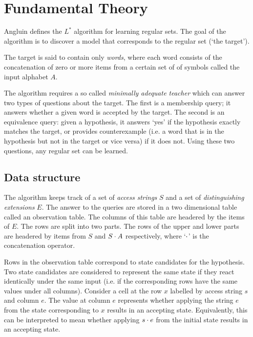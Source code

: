 \documentclass[multi,crop=false,class=article]{standalone}
\begin{document}
\section{Fundamental Theory}
\label{sec:fundamental-theory}

Angluin defines the $L^*$ algorithm for learning regular sets\cite{Angluin87}.
The goal of the algorithm is to discover a model that corresponds to the regular
set (`the target').

The target is said to contain only \textit{words}, where each word consists
of the concatenation of zero or more items from a certain set of of symbols
called the input alphabet $A$.

The algorithm requires a so called \textit{minimally adequate teacher} which can
answer two types of questions about the target. The first is a membership query;
it answers whether a given word is accepted by the target. The second is an
equivalence query: given a hypothesis, it answers `yes' if the hypothesis
exactly matches the target, or provides counterexample (i.e. a word that is in
the hypothesis but not in the target or vice versa) if it does not. Using these
two questions, any regular set can be learned.

\subsection{Data structure}
\label{sec:data-structure}
The algorithm keeps track of a set of \textit{access strings} $S$ and a set of
\textit{distinguishing extensions} $E$. The answer to the queries are stored in
a two dimensional table called an observation table. The columns of this table
are headered by the items of $E$. The rows are split into two parts. The rows of
the upper and lower parts are headered by items from $S$ and $S \cdot A$
respectively, where `$\cdot$' is the concatenation operator. 

Rows in the observation table correspond to state candidates for the hypothesis.
Two state candidates are considered to represent the same state if they react
identically under the same input (i.e. if the corresponding rows have the same
values under all columns). Consider a cell at the row $x$ labelled by access
string $s$ and column $e$. The value at column $e$ represents whether applying
the string $e$ from the state corresponding to $x$ results in an accepting
state. Equivalently, this can be interpreted to mean whether applying $s \cdot
e$ from the initial state results in an accepting state.
\end{document}
